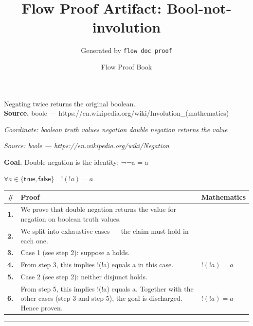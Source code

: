 \documentclass[11pt]{article}
\title{Flow Proof Artifact: Bool-not-involution}
\author{Generated by \texttt{flow doc proof}}
\date{Flow Proof Book}
\theoremstyle{definition}
\begin{document}
\maketitle
Negating twice returns the original boolean.\\[0.5em]
\textbf{Source.} boole — https://en.wikipedia.org/wiki/Involution\_(mathematics)\\[0.5em]
\bigskip
{}\par
\smallskip\noindent\textit{Coordinate: boolean truth values \cdot negation \cdot double negation returns the value}\par
\smallskip\noindent\textit{Source: boole — https://en.wikipedia.org/wiki/Negation}\par
\medskip
\noindent\textbf{Goal.} Double negation is the identity: ¬¬a = a\par
\noindent$\displaystyle \forall a \in \{\mathsf{true}, \mathsf{false}\}\quad !(!a) = a$\par
\medskip
\noindent
\begin{tabular}{@{} >{\raggedright\arraybackslash}p{} >{\raggedright\arraybackslash}p{} >{\raggedleft\arraybackslash}p{} @{}}
\textbf{\#} & \textbf{Proof} & \textbf{Mathematics} \\
\midrule
\textbf{1.} & We prove that double negation returns the value for negation on boolean truth values. & \\[0.45em]
\textbf{2.} & We split into exhaustive cases — the claim must hold in each one. & \\[0.45em]
\textbf{3.} & Case 1 (see step 2): suppose a holds. & \\[0.45em]
\textbf{4.} & From step 3, this implies !(!a) equals a in this case. & $\displaystyle !(!a) = a$ \\[0.45em]
\textbf{5.} & Case 2 (see step 2): neither disjunct holds. & \\[0.45em]
\textbf{6.} & From step 5, this implies !(!a) equals a. Together with the other cases (step 3 and step 5), the goal is discharged. Hence proven. & $\displaystyle !(!a) = a$ \\[0.45em]
\bottomrule
\end{tabular}
\label{thm:Bool-negation-double_negation_returns_the_value}
\par\medskip\hrule
\end{document}
